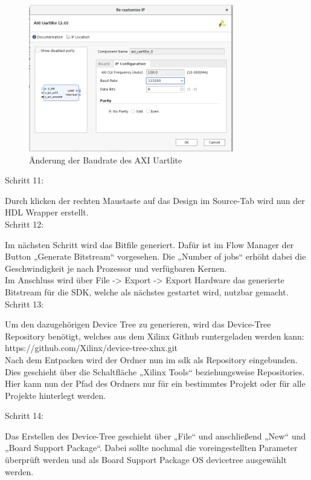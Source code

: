 \begin{figure}[H]
\centering
\includegraphics[width=0.8\textwidth]{Hauptteil/Schritt10.png}
\caption{Änderung der Baudrate des AXI Uartlite}\label{fig:mbschritt10}
\end{figure}

Schritt 11:

Durch klicken der rechten Maustaste auf das Design im Source-Tab wird nun der HDL Wrapper erstellt.\\

Schritt 12:

Im nächsten Schritt wird das Bitfile generiert. Dafür ist im Flow Manager der Button „Generate Bitstream“ vorgesehen.
 Die „Number of jobs“ erhöht dabei die Geschwindigkeit je nach Prozessor und verfügbaren Kernen.\\
 Im Anschluss wird über File -> Export -> Export Hardware das generierte Bitstream für die SDK, welche als nächstes gestartet wird, nutzbar gemacht.\\


Schritt 13:

Um den dazugehörigen Device Tree zu generieren, wird das Device-Tree
 Repository benötigt, welches aus dem Xilinx Github runtergeladen werden kann: https://github.com/Xilinx/device-tree-xlnx.git\\
Nach dem Entpacken wird der Ordner nun im \ac{sdk} als Repository eingebunden.
 Dies geschieht über die Schaltfläche „Xilinx Tools“ beziehungsweise Repositories.
  Hier kann nun der Pfad des Ordners nur für ein bestimmtes Projekt oder für alle Projekte hinterlegt werden.

Schritt 14:

Das Erstellen des Device-Tree geschieht über „File“ und anschließend „New“ und „Board Support Package“.
Dabei sollte nochmal die voreingestellten Parameter überprüft werden und als Board Support Package OS
devicetree ausgewählt werden.

